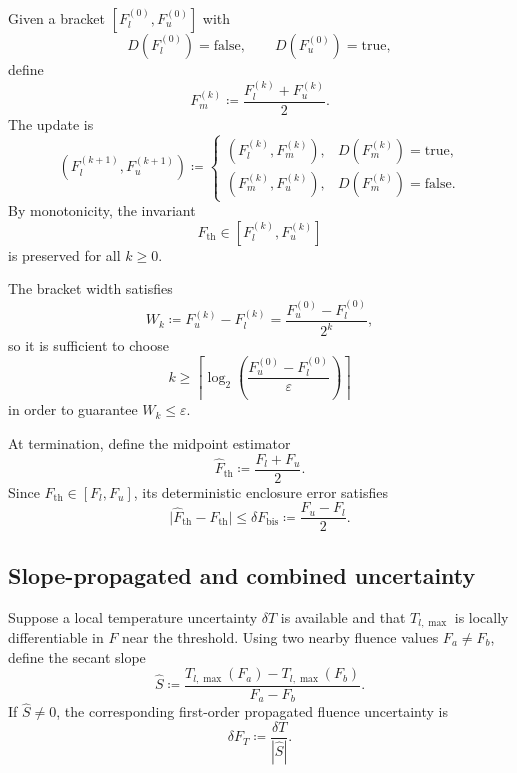 Given a bracket \([F_l^{(0)},F_u^{(0)}]\) with
\[
    D(F_l^{(0)})=\mathrm{false},
    \qquad
    D(F_u^{(0)})=\mathrm{true},
\]
define
\begin{equation}
    F_m^{(k)}
    \coloneqq
    \frac{F_l^{(k)}+F_u^{(k)}}{2}.
    \label{eq:app-midpoint}
\end{equation}
The update is
\begin{equation}
    (F_l^{(k+1)},F_u^{(k+1)})
    \coloneqq
    \begin{cases}
        (F_l^{(k)},F_m^{(k)}), & D(F_m^{(k)})=\mathrm{true},  \\
        (F_m^{(k)},F_u^{(k)}), & D(F_m^{(k)})=\mathrm{false}.
    \end{cases}
    \label{eq:app-bisection-update}
\end{equation}
By monotonicity, the invariant
\[
    F_{\mathrm{th}}\in[F_l^{(k)},F_u^{(k)}]
\]
is preserved for all \(k\ge 0\).

The bracket width satisfies
\begin{equation}
    W_k \coloneqq F_u^{(k)}-F_l^{(k)}
    =
    \frac{F_u^{(0)}-F_l^{(0)}}{2^k},
    \label{eq:app-bisection-width}
\end{equation}
so it is sufficient to choose
\begin{equation}
    k
    \ge
    \left\lceil
    \log_2\!\left(
    \frac{F_u^{(0)}-F_l^{(0)}}{\varepsilon}
    \right)
    \right\rceil
    \label{eq:app-bisection-cost}
\end{equation}
in order to guarantee \(W_k\le \varepsilon\).

At termination, define the midpoint estimator
\begin{equation}
    \hat F_{\mathrm{th}}
    \coloneqq
    \frac{F_l+F_u}{2}.
    \label{eq:app-midpoint-estimate}
\end{equation}
Since \(F_{\mathrm{th}}\in[F_l,F_u]\), its deterministic enclosure error satisfies
\begin{equation}
    \bigl|\hat F_{\mathrm{th}}-F_{\mathrm{th}}\bigr|
    \le
    \delta F_{\mathrm{bis}}
    \coloneqq
    \frac{F_u-F_l}{2}.
    \label{eq:app-bisection-uncertainty}
\end{equation}

\subsection{Slope-propagated and combined uncertainty}

Suppose a local temperature uncertainty \(\delta T\) is available and that
\(T_{l,\max}\) is locally differentiable in \(F\) near the threshold.
Using two nearby fluence values \(F_a\neq F_b\), define the secant slope
\begin{equation}
    \hat S
    \coloneqq
    \frac{T_{l,\max}(F_a)-T_{l,\max}(F_b)}{F_a-F_b}.
    \label{eq:app-slope}
\end{equation}
If \(\hat S\neq 0\), the corresponding first-order propagated fluence uncertainty is
\begin{equation}
    \delta F_T
    \coloneqq
    \frac{\delta T}{|\hat S|}.
    \label{eq:app-temp-uncertainty}
\end{equation}

